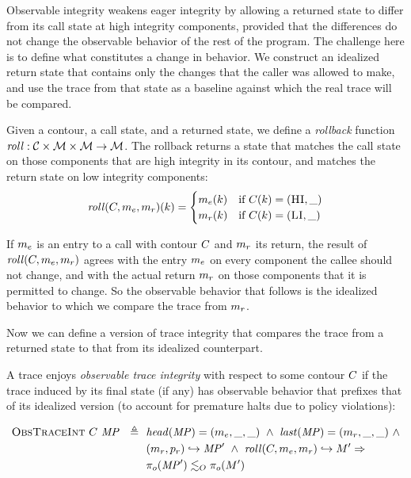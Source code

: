 \documentclass[acmsmall,review,anonymous]{acmart}\settopmatter{printfolios=true,printccs=false,printacmref=false}
\begin{document}
{Observable integrity weakens eager integrity by allowing a returned
state to differ from its call state at high integrity components,
provided that the differences do not change the observable behavior of
the rest of the program. The challenge here is to define what constitutes
a change in behavior. We construct an idealized return state that
contains only the changes that the caller was allowed to make, and use
the trace from that state as a baseline against which the real trace
will be compared.


      Given a contour, a call state, and a returned state, we define a
      {\em rollback} function \(\mathit{roll} : {\mathcal C} \times {\mathcal M} \times
      {\mathcal M} \rightarrow {\mathcal M}\). The rollback returns a state that matches
      the call state on those components that are high integrity in its
      contour, and matches the return state on low integrity components:
      \[\mathit{roll}(C,m_e,m_r)(k) =
      \begin{cases}
        m_e(k) & \text{if } C(k) = (\textsc{HI},\_) \\
        m_r(k) & \text{if } C(k) = (\textsc{LI},\_) \\
      \end{cases}\]

      If \(m_e\) is an entry to a call with contour \(C\)
      and \(m_r\) its return, the result of
      \(\mathit{roll}(C,m_e,m_r)\) agrees with the
      entry \(m_e\) on every component the callee should not
      change, and with the actual return \(m_r\) on those
      components that it is permitted to change.  So the observable
      behavior that follows is the idealized behavior to which we
      compare the trace from \(m_r\).

      Now we can define a version of trace integrity that compares the trace
      from a returned state to that from its idealized counterpart.


      A trace enjoys {\em observable trace integrity} with respect to
      some contour \(C\) if the trace induced by its final
      state (if any) has observable behavior that prefixes that of its
      idealized version (to account for premature halts due to policy
      violations):

      \[\begin{split}
        \text{\sc ObsTraceInt} ~ C ~ \mathit{MP} \ \ \triangleq \ \
        & \mathit{head}(\mathit{MP}) = (m_e,\_,\_) ~ \land ~
          \mathit{last}(\mathit{MP}) = (m_r,\_,\_) ~ \land \\
        & (m_r,p_r) \hookrightarrow \mathit{MP}' ~ \land ~
          \mathit{roll}(C,m_e,m_r) \hookrightarrow M'
          \Rightarrow \\
        & \pi_o(\mathit{MP}') \lesssim_O \pi_o(M')
      \end{split}\]

}
\end{document}

